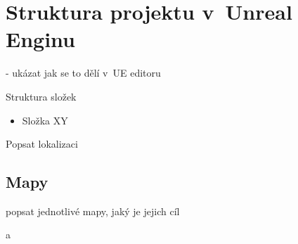 
\section{Struktura projektu v~Unreal Enginu}
\label{sec:ueStructure}

- ukázat jak se to dělí v~UE editoru

Struktura složek

\begin{itemize}
	\item Složka XY
\end{itemize}

Popsat lokalizaci

\subsection{Mapy}

popsat jednotlivé mapy, jaký je jejich cíl

a

